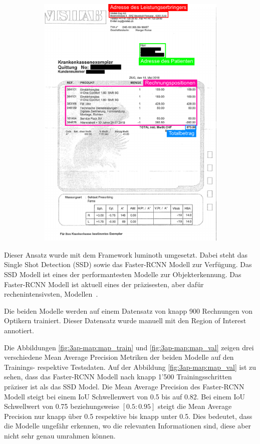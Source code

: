 \begin{figure}[H]
\begin{subfigure}[t]{0.5\linewidth}
    \includegraphics[scale=1]{graphics/roi-example-scan.pdf}
    \vspace{2ex}
  \end{subfigure}
\end{figure}

Dieser Ansatz wurde mit dem Framework luminoth umgesetzt. Dabei steht das Single Shot Detection (SSD) sowie das Faster-RCNN Modell zur Verfügung. Das SSD Modell ist eines der performantesten Modelle zur Objekterkennung. Das Faster-RCNN Modell ist aktuell eines der präzisesten, aber dafür rechenintensivsten, Modellen~\autocite{SSDFRCNN}.

Die beiden Modelle werden auf einem Datensatz von knapp 900 Rechnungen von Optikern trainiert. Dieser Datensatz wurde manuell mit den Region of Interest annotiert.

Die Abbildungen \ref{fig:3ap-map:map_train} und \ref{fig:3ap-map:map_val} zeigen drei verschiedene Mean Average Precision Metriken der beiden Modelle auf den Trainings- respektive Testsdaten. Auf der Abbildung \ref{fig:3ap-map:map_val} ist zu sehen, dass das Faster-RCNN Modell nach knapp 1'500 Trainingsschritten präziser ist als das SSD Model. Die Mean Average Precision des Faster-RCNN Modell steigt bei einem IoU Schwellenwert von 0.5 bis auf 0.82. Bei einem IoU Schwellwert von 0.75 beziehungsweise $[0.5:0.95]$ steigt die Mean Average Precision nur knapp über 0.5 respektive bis knapp unter 0.5. Dies bedeutet, dass die Modelle ungefähr erkennen, wo die relevanten Informationen sind, diese aber nicht sehr genau umrahmen können.

